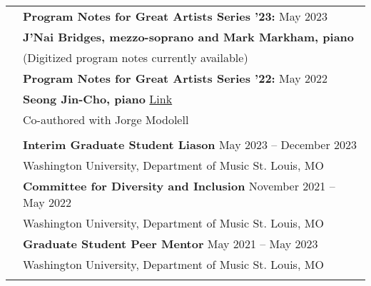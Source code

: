 \documentclass[letterpaper, 11pt]{article}
\begin{document}
\begin{longtable}{p{1.3in}p{4.8in}}
\nohyphens{\color{OliveGreen}{Public Scholarship}} 
& \textbf{Program Notes for Great Artists Series '23:} \hfill{May 2023} \\
& \textbf{J'Nai Bridges, mezzo-soprano and Mark Markham, piano} \\
& (Digitized program notes currently available) \\

& \textbf{Program Notes for Great Artists Series '22:} \hfill{May 2022} \\
& \textbf{Seong Jin-Cho, piano} \hfill \href{https://music.wustl.edu/events/great-artists-series-cho?d=2022-05-01}{Link} \\
& Co-authored with Jorge Modolell \\
& \\

\color{OliveGreen}{University Service}
& \textbf{Interim Graduate Student Liason} \hfill May 2023 -- December 2023 \\
& Washington University, Department of Music \hfill St. Louis, MO\\
& \textbf{Committee for Diversity and Inclusion} \hfill November 2021 -- May 2022 \\
& Washington University, Department of Music \hfill St. Louis, MO\\
& \textbf{Graduate Student Peer Mentor} \hfill May 2021  -- May 2023 \\
& Washington University, Department of Music \hfill St. Louis, MO\\
& \\


\end{longtable}
\end{document}
